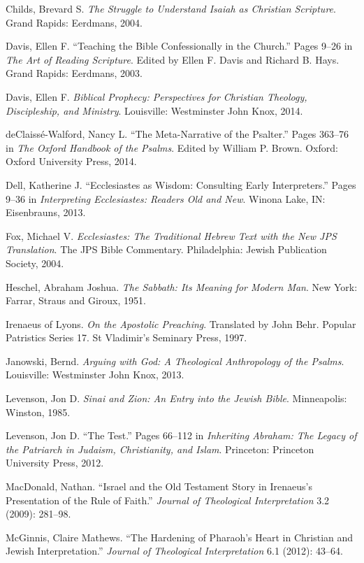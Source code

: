 \documentclass[titlepage]{article}
\begin{document}
\begin{thebibliography}{99}
 Childs, Brevard S. \emph{The Struggle to Understand Isaiah as Christian Scripture}. Grand Rapids: Eerdmans, 2004.

 Davis, Ellen F. “Teaching the Bible Confessionally in the Church.” Pages 9–26 in \emph{The Art of Reading Scripture}. Edited by Ellen F. Davis and Richard B. Hays. Grand Rapids: Eerdmans, 2003.

 Davis, Ellen F. \emph{Biblical Prophecy: Perspectives for Christian Theology, Discipleship, and Ministry}. Louisville: Westminster John Knox, 2014.

 deClaissé-Walford, Nancy L. “The Meta-Narrative of the Psalter.” Pages 363–76 in \emph{The Oxford Handbook of the Psalms}. Edited by William P. Brown. Oxford: Oxford University Press, 2014.

 Dell, Katherine J. “Ecclesiastes as Wisdom: Consulting Early Interpreters.” Pages 9–36 in \emph{Interpreting Ecclesiastes: Readers Old and New}. Winona Lake, IN: Eisenbrauns, 2013.

 Fox, Michael V. \emph{Ecclesiastes: The Traditional Hebrew Text with the New JPS Translation}. The JPS Bible Commentary. Philadelphia: Jewish Publication Society, 2004.

 Heschel, Abraham Joshua. \emph{The Sabbath: Its Meaning for Modern Man}. New York: Farrar, Straus and Giroux, 1951.

 Irenaeus of Lyons. \emph{On the Apostolic Preaching}. Translated by John Behr. Popular Patristics Series 17. St Vladimir’s Seminary Press, 1997.

 Janowski, Bernd. \emph{Arguing with God: A Theological Anthropology of the Psalms}. Louisville: Westminster John Knox, 2013.

 Levenson, Jon D. \emph{Sinai and Zion: An Entry into the Jewish Bible}. Minneapolis: Winston, 1985.

 Levenson, Jon D. “The Test.” Pages 66–112 in \emph{Inheriting Abraham: The Legacy of the Patriarch in Judaism, Christianity, and Islam}. Princeton: Princeton University Press, 2012.

 MacDonald, Nathan. “Israel and the Old Testament Story in Irenaeus’s Presentation of the Rule of Faith.” \emph{Journal of Theological Interpretation} 3.2 (2009): 281–98.

 McGinnis, Claire Mathews. “The Hardening of Pharaoh’s Heart in Christian and Jewish Interpretation.” \emph{Journal of Theological Interpretation} 6.1 (2012): 43–64.


\end{thebibliography}
\end{document}
